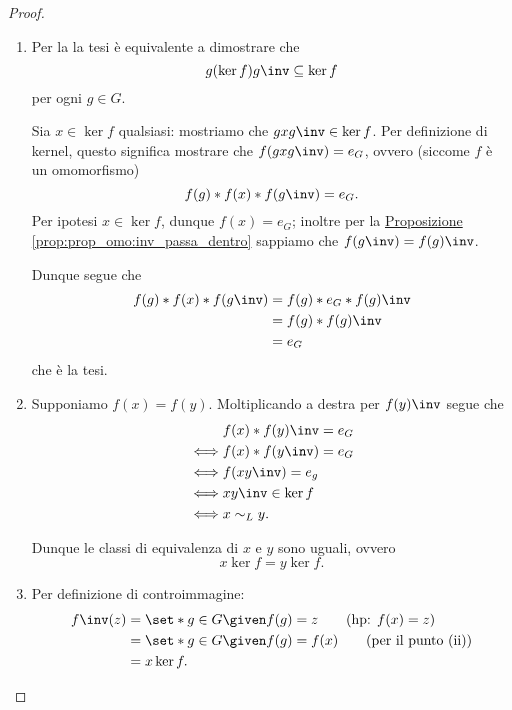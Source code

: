 \begin{proof}
    \begin{enumerate}[label={(\roman*)}]
        \item Per la  la tesi è equivalente a dimostrare che \[
            g(\ker f) g\inv \subseteq \ker f   
        \] per ogni $g \in G$.
        
        Sia $x \in \ker f$ qualsiasi: mostriamo che $gxg\inv \in \ker f$. Per definizione di kernel, questo significa mostrare che $f(gxg\inv) = e_G$, ovvero (siccome $f$ è un omomorfismo) \[
            f(g) * f(x) * f(g\inv) = e_G.    
        \] Per ipotesi $x \in \ker f$, dunque $f(x) = e_G$; inoltre per la \hyperref[prop:prop_omo:inv_passa_dentro]{Proposizione \ref*{prop:prop_omo:inv_passa_dentro}} sappiamo che $f(g\inv) = f(g)\inv$.
        
        Dunque segue che \begin{align*}
            f(g) * f(x) * f(g\inv) &= f(g) * e_G * f(g)\inv\\
            &= f(g) * f(g)\inv \\
            &= e_G
        \end{align*} che è la tesi.
        \item Supponiamo $f(x) = f(y)$. Moltiplicando a destra per $f(y)\inv$ segue che \begin{align*}
            &f(x) * f(y)\inv = e_G \\
            \iff &f(x) * f(y\inv) = e_G \\
            \iff &f(xy\inv) = e_g\\
            \iff &xy\inv \in \ker f\\
            \iff &x \sim_L y.
        \end{align*}
        
        Dunque le classi di equivalenza di $x$ e $y$ sono uguali, ovvero \[
            x\ker f = y\ker f.    
        \]
        \item Per definizione di controimmagine: \begin{align*}
            f\inv(z) &= \set*{g \in G \given f(g) = z} \tag{hp: $f(x) = z$} \\
            &= \set*{g \in G \given f(g) = f(x)} \tag{per il punto (ii)}\\
            &= x\ker f. \tag*{\qedhere}
        \end{align*}
    \end{enumerate}
\end{proof}

